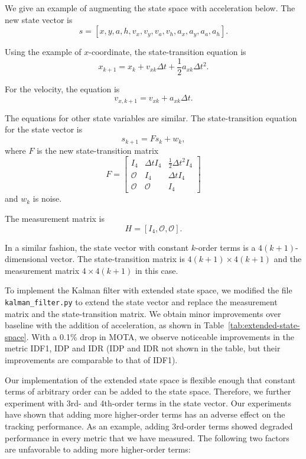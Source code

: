 \documentclass[conference]{IEEEtran}
\begin{document}
We give an example of augmenting the state space with acceleration below. The new state vector is
\[
    s = [x, y, a, h, v_x, v_y, v_a, v_h, a_x, a_y, a_a, a_h].
\]

Using the example of $x$-coordinate, the state-transition equation is
\[
    x_{k + 1} = x_k + v_{xk} \Delta t + \frac{1}{2} a_{xk} \Delta t^2.
\]

For the velocity, the equation is
\[
    v_{x, k + 1} = v_{xk} + a_{xk} \Delta t.
\]

The equations for other state variables are similar. The state-transition equation for the state vector is
\[
    s_{k + 1} = Fs_k + w_k,
\]
where $F$ is the new state-transition matrix
\[
    F = \begin{bmatrix}
        I_4 & \Delta t I_4 & \frac{1}{2} \Delta t^2 I_4\\
        \mathcal{O} & I_4 & \Delta t I_4\\
        \mathcal{O} & \mathcal{O} & I_4
    \end{bmatrix}
\]
and $w_k$ is noise.

The measurement matrix is
\[
    H = [I_4, \mathcal{O}, \mathcal{O}].
\]

In a similar fashion, the state vector with constant $k$-order terms is a $4(k + 1)$-dimensional vector. The state-transition matrix is $4(k + 1) \times 4(k + 1)$ and the measurement matrix $4 \times 4(k + 1)$ in this case.

To implement the Kalman filter with extended state space, we modified the file \texttt{kalman\_filter.py} to extend the state vector and replace the measurement matrix and the state-transition matrix. We obtain minor improvements over baseline with the addition of acceleration, as shown in Table~\ref{tab:extended-state-space}. With a 0.1\% drop in MOTA, we observe noticeable improvements in the metric IDF1, IDP and IDR (IDP and IDR not shown in the table, but their improvements are comparable to that of IDF1).

Our implementation of the extended state space is flexible enough that constant terms of arbitrary order can be added to the state space. Therefore, we further experiment with 3rd- and 4th-order terms in the state vector. Our experiments have shown that adding more higher-order terms has an adverse effect on the tracking performance. As an example, adding 3rd-order terms showed degraded performance in every metric that we have measured. The following two factors are unfavorable to adding more higher-order terms:
\end{document}
